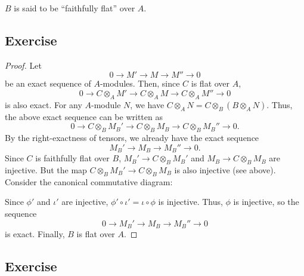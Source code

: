 \begin{remark}
$B$ is said to be ``faithfully flat'' over $A$.
\end{remark}

\subsection{Exercise}\label{3.17}

\begin{proof}
Let 
$$0 \to M' \to M \to M'' \to 0$$
be an exact sequence of $A$-modules. Then, since $C$ is flat over $A$,
$$0 \to C \otimes_A M' \to C \otimes_A M \to C \otimes_A M'' \to 0$$
is also exact. For any $A$-module $N$, we have $C \otimes_A N = C \otimes_B (B \otimes_A N)$. Thus, the above exact sequence can be written as
$$0 \to C \otimes_B M_B' \to C \otimes_B M_B \to C \otimes_B M_B'' \to 0.$$
By the right-exactness of tensors, we already have the exact sequence
$$M_B' \to M_B \to M_B'' \to 0.$$
Since $C$ is faithfully flat over $B$, $M_B' \to C \otimes_B M_B'$ and $M_B \to C \otimes_B M_B$ are injective. But the map
$C \otimes_B M_B' \to C \otimes_B M_B$ is also injective (see above). Consider the canonical commutative diagram:
\begin{center}
\end{center}
Since $\phi'$ and $\iota'$ are injective, $\phi' \circ \iota' = \iota \circ \phi$ is injective. Thus, $\phi$ is injective, so the sequence
$$0 \to M_B' \to M_B \to M_B'' \to 0$$
is exact. Finally, $B$ is flat over $A$.
\end{proof}

\subsection{Exercise}\label{3.18}

